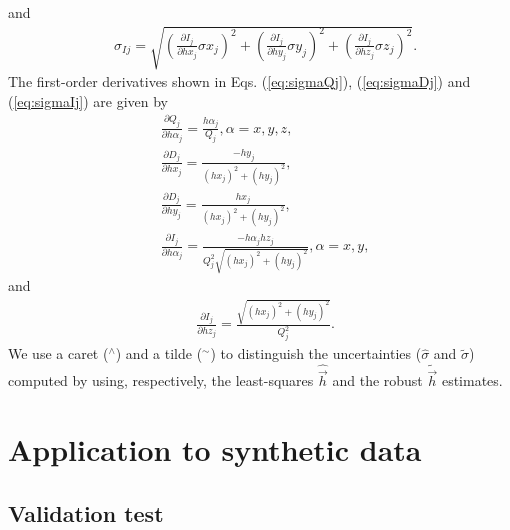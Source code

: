 \documentclass[journal abbreviation, npg]{copernicus}
\begin{document}
and
\begin{align}
 &
\sigma_{Ij} = \sqrt{\left(\frac{\partial I_{j}}{\partial hx_{j}}  \sigma x_{j} \right)^{2} +
                    \left(\frac{\partial I_{j}}{\partial hy_{j}}  \sigma y_{j} \right)^{2} +
                    \left(\frac{\partial I_{j}}{\partial hz_{j}}  \sigma z_{j} \right)^{2}} .
\label{eq:sigmaIj}
\end{align}
The first-order derivatives shown in Eqs. (\ref{eq:sigmaQj}), (\ref{eq:sigmaDj}) and (\ref{eq:sigmaIj}) are given by
\begin{align}
 &
\frac{\partial Q_{j}}{\partial h \alpha_{j}} = \frac{h \alpha_{j}}{Q_{j}} ,  \alpha = x, y, z ,
\label{eq:dQj-dhalphaj}
\\
&
\frac{\partial D_{j}}{\partial hx_{j}} = \frac{- hy_{j}}{\left(hx_{j} \right)^{2} + \left(hy_{j} \right)^{2}} ,
\label{eq:dDj-dhxj}
\\
&
\frac{\partial D_{j}}{\partial hy_{j}} = \frac{hx_{j}} {\left(hx_{j} \right)^{2} + \left(hy_{j} \right)^{2}} ,
\label{eq:dDj-dhyj}
\\
&
\frac{\partial I_{j}}{\partial h \alpha_{j}} = \frac{-h \alpha_{j} hz_{j}}{Q_{j}^{2} \sqrt{\left(hx_{j} \right)^{2} + \left(hy_{j} \right)^{2}}} ,  \alpha = x, y ,
\label{eq:dIj-dhalphaj}
\end{align}
and
\begin{align}
 &
\frac{\partial I_{j}}{\partial hz_{j}} = \frac{\sqrt{(hx_{j} )^{2} + (hy_{j} )^{2}}} {Q_{j}^{2}} .
\label{eq:dIj-dhzj}
\end{align}
We use a caret ($^{\wedge}$) and a tilde ($^{\sim}$) to distinguish
the uncertainties ($\hat{\sigma}$ and $\tilde{\sigma}$) computed by
using, respectively, the least-squares $\hat{\vec{h}}$ and the robust
$\tilde{\vec{h}}$ estimates.

\section{Application to synthetic data}

\subsection{Validation test}
\end{document}

